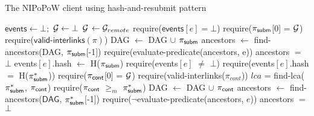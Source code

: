 \begin{algorithm}

    \caption{\label{alg:har-nipopow}The \textsf{NIPoPoW} client using hash-and-resubmit pattern}
    \begin{algorithmic}[1]

    \State $\textsf{events} \gets \bot;$ $\mathcal{G} \gets \bot$
        \State $\mathcal{G}$ $\gets \mathcal{G}_{remote}$
    \EndFunction
        \State \textsf{require}($\textsf{events$[e]$} = \bot$)
        \State \textsf{require}($\mathsf{\pi_{subm}}$[0] = $\mathcal{G}$)
        \State \textsf{require}($\textsf{valid-interlinks}(\pi)$)
        \State \textsf{DAG} $\gets$ \textsf{DAG} $\cup$ $\mathsf{\pi_{subm}}$
        \State \textsf{ancestors} $\gets$ \textsf{find-ancestors(DAG, $\mathsf{\pi_{subm}}$[-1])}
        \State \textsf{require}(\textsf{evaluate-predicate}(\textsf{ancestors},
        e))
        \State \textsf{ancestors} $=$ $\bot$
        \State \textsf{events$[e]$.hash} $\gets$ \textsf{H}($\mathsf{\pi_{subm}}$)
        \EndFunction
        \State \textsf{require}(\textsf{events}$[e]$ $\ne$ $\bot$)
        \State \textsf{require}(\textsf{events$[e]$.hash} $=$ \textsf{H}($\mathsf{\pi_{subm}^*}$))
        \State \textsf{require}($\mathsf{\pi_{cont}}$[0] = $\mathcal{G}$)
        \State \textsf{require}(\textsf{valid-interlinks}($\pi_{cont}$))
        \State $lca$ = \textsf{find-lca}($\mathsf{\pi_{subm}^*}$, $\mathsf{\pi_{cont}}$)
        \State \textsf{require}($\mathsf{\pi_{cont}}$ $\geq_m$ $\mathsf{\pi_{subm}^*}$)
        \State \textsf{DAG} $\gets$ \textsf{DAG} $\cup$ $\mathsf{\pi_{cont}}$
        \State \textsf{ancestors} $\gets$
        \textsf{find-ancestors}($\textsf{DAG}$, $\mathsf{\pi_{subm}^*}$[-1])
        \State \textsf{require}($\neg$\textsf{evaluate-predicate}(\textsf{ancestors}, $e$))
        \State \textsf{ancestors} $=$ $\bot$
    \EndFunction
    \EndContract
    \vskip8pt
    \end{algorithmic}
\end{algorithm}

